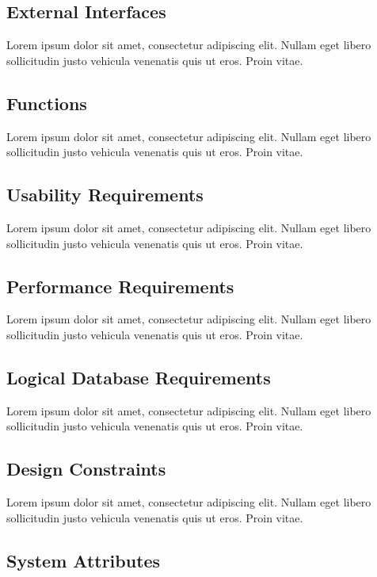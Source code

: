 \documentclass[a4paper]{article}
\begin{document}
        \subsection{External Interfaces}

        Lorem ipsum dolor sit amet, consectetur adipiscing elit. Nullam eget libero sollicitudin justo vehicula venenatis quis ut eros. Proin vitae.

        \subsection{Functions}

        Lorem ipsum dolor sit amet, consectetur adipiscing elit. Nullam eget libero sollicitudin justo vehicula venenatis quis ut eros. Proin vitae.

        \subsection{Usability Requirements}

        Lorem ipsum dolor sit amet, consectetur adipiscing elit. Nullam eget libero sollicitudin justo vehicula venenatis quis ut eros. Proin vitae.

        \subsection{Performance Requirements}

        Lorem ipsum dolor sit amet, consectetur adipiscing elit. Nullam eget libero sollicitudin justo vehicula venenatis quis ut eros. Proin vitae.

        \subsection{Logical Database Requirements}

        Lorem ipsum dolor sit amet, consectetur adipiscing elit. Nullam eget libero sollicitudin justo vehicula venenatis quis ut eros. Proin vitae.

        \subsection{Design Constraints}

        Lorem ipsum dolor sit amet, consectetur adipiscing elit. Nullam eget libero sollicitudin justo vehicula venenatis quis ut eros. Proin vitae.

        \subsection{System Attributes}
\end{document}
